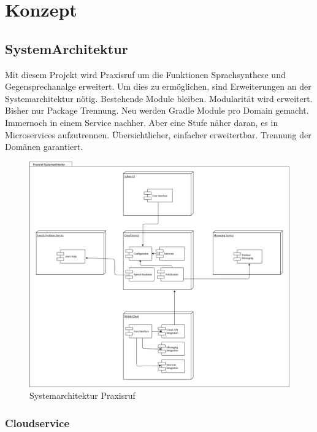 \section{Konzept}

\subsection{SystemArchitektur}

Mit diesem Projekt wird Praxisruf um die Funktionen Sprachsynthese und Gegensprechanalge erweitert.
Um dies zu ermöglichen, sind Erweiterungen an der Systemarchitektur nötig.
Bestehende Module bleiben.
Modularität wird erweitert.
Bisher nur Package Trennung.
Neu werden Gradle Module pro Domain gemacht.
Immernoch in einem Service nachher.
Aber eine Stufe näher daran, es in Microservices aufzutrennen.
Übersichtlicher, einfacher erweitertbar.
Trennung der Domänen garantiert.

\begin{figure}[h]
    \centering
    \begin{minipage}[b]{0.9\textwidth}
        \includegraphics[width=\textwidth]{graphics/diagramms/Component_System_V01}
        \caption{Systemarchitektur Praxisruf}
    \end{minipage}
\end{figure}

\subsubsection*{Cloudservice}


